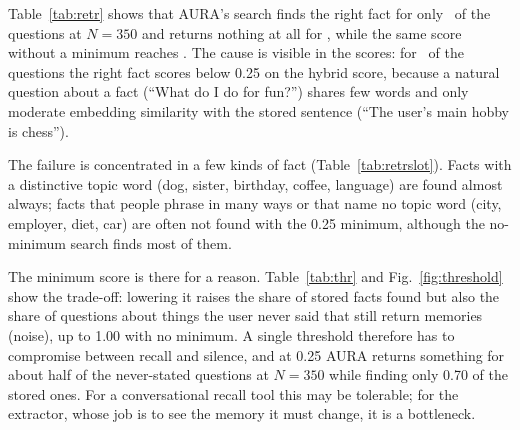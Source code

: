 \IfFileExists{IEEEtran.cls}{\documentclass[journal]{IEEEtran}\def\HAVEIEEE{1}}{\documentclass[10pt,twocolumn]{article}\usepackage[margin=0.7in,columnsep=0.25in]{geometry}}
\begin{document}
\begin{table}[!t]
\centering\small
\caption{Retrieval: share of questions whose answer memory is in the top six.}
\label{tab:retr}
\end{table}

Table~\ref{tab:retr} shows that AURA's search finds the right fact for only \retrAuraHit\ of the questions at $N=350$ and returns nothing at all for \retrAuraEmpty, while the same score without a minimum reaches \retrNominHit. The cause is visible in the scores: for \retrBelowMin\ of the questions the right fact scores below 0.25 on the hybrid score, because a natural question about a fact (``What do I do for fun?'') shares few words and only moderate embedding similarity with the stored sentence (``The user's main hobby is chess'').

\begin{table}[t]
\centering\small
\caption{Retrieval by kind of fact at $N=350$ (hit@6; mean cosine similarity of the right fact).}
\label{tab:retrslot}
\end{table}

The failure is concentrated in a few kinds of fact (Table~\ref{tab:retrslot}). Facts with a distinctive topic word (dog, sister, birthday, coffee, language) are found almost always; facts that people phrase in many ways or that name no topic word (city, employer, diet, car) are often not found with the 0.25 minimum, although the no-minimum search finds most of them.

\begin{table}[!t]
\centering\small
\caption{Minimum score trade-off: found / noise for $N$ and minimum score. Found: share of stored-fact questions answered; noise: share of never-stated questions that still return memories.}
\label{tab:thr}
\end{table}

The minimum score is there for a reason. Table~\ref{tab:thr} and Fig.~\ref{fig:threshold} show the trade-off: lowering it raises the share of stored facts found but also the share of questions about things the user never said that still return memories (noise), up to 1.00 with no minimum. A single threshold therefore has to compromise between recall and silence, and at 0.25 AURA returns something for about half of the never-stated questions at $N=350$ while finding only 0.70 of the stored ones. For a conversational recall tool this may be tolerable; for the extractor, whose job is to see the memory it must change, it is a bottleneck.
\end{document}
